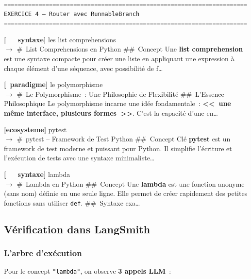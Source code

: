 \documentclass[11pt,a4paper]{article}
\begin{document}
\begin{tcolorbox}[
  colback=white,
  colframe=black!50,
  coltitle=black,
  fonttitle=\footnotesize\bfseries,
  fontupper=\footnotesize,
  title=Sortie de l'exécution,
  breakable,
]
\begin{verbatim}
======================================================================
EXERCICE 4 — Router avec RunnableBranch
======================================================================
\end{verbatim}

\textbf{[~~~syntaxe]} les list comprehensions\\
$\rightarrow$ \#~List Comprehensions en Python \quad \#\#~Concept \quad Une
\textbf{list comprehension} est une syntaxe compacte pour créer une liste
en appliquant une expression à chaque élément d'une séquence, avec
possibilité de f\dots

\textbf{[~paradigme]} le polymorphisme\\
$\rightarrow$ \#~Le Polymorphisme~: Une Philosophie de Flexibilité \quad
\#\#~L'Essence Philosophique \quad Le polymorphisme incarne une idée
fondamentale~: \textbf{<<~une même interface, plusieurs formes~>>}. C'est
la capacité d'une en\dots

\textbf{[ecosysteme]} pytest\\
$\rightarrow$ \#~pytest -- Framework de Test Python \quad \#\#~Concept Clé
\quad \textbf{pytest} est un framework de test moderne et puissant pour
Python. Il simplifie l'écriture et l'exécution de tests avec une syntaxe
minimaliste\dots

\textbf{[~~~syntaxe]} lambda\\
$\rightarrow$ \#~Lambda en Python \quad \#\#~Concept \quad Une
\textbf{lambda} est une fonction anonyme (sans nom) définie en une seule
ligne. Elle permet de créer rapidement des petites fonctions sans
utiliser \texttt{def}. \quad \#\#~Syntaxe exa\dots
\end{tcolorbox}

\subsection{Vérification dans LangSmith}

\subsubsection*{L'arbre d'exécution}

Pour le concept \texttt{"lambda"}, on observe \textbf{3 appels LLM}~:
\end{document}
